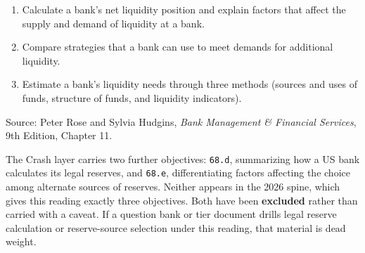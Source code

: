 
\begin{lrkeybox}
\begin{enumerate}[label=\textbf{\alph*.}]
\item Calculate a bank's net liquidity position and explain factors that affect the supply and demand of liquidity at a bank.
\item Compare strategies that a bank can use to meet demands for additional liquidity.
\item Estimate a bank's liquidity needs through three methods (sources and uses of funds, structure of funds, and liquidity indicators).
\end{enumerate}
{\footnotesize\color{FRMGrey}Source: Peter Rose and Sylvia Hudgins, \textit{Bank Management \& Financial Services}, 9th Edition, Chapter 11.}
\end{lrkeybox}

\begin{lrtrapbox}
The Crash layer carries two further objectives: \texttt{68.d}, summarizing how a US bank calculates its legal reserves, and \texttt{68.e}, differentiating factors affecting the choice among alternate sources of reserves. Neither appears in the 2026 spine, which gives this reading exactly three objectives. Both have been \textbf{excluded} rather than carried with a caveat. If a question bank or tier document drills legal reserve calculation or reserve-source selection under this reading, that material is dead weight.
\end{lrtrapbox}


